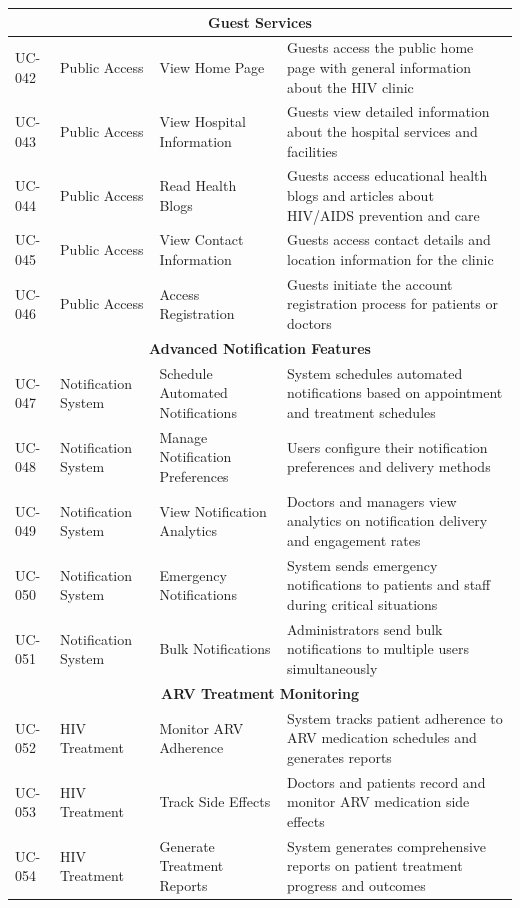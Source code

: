 \documentclass[12pt,a4paper]{article}
\begin{document}
\begin{longtable}{|p{1cm}|p{3cm}|p{3cm}|p{7cm}|}
\hline
\multicolumn{4}{|c|}{\textbf{Guest Services}} \\
\hline
UC-042 & Public Access & View Home Page & Guests access the public home page with general information about the HIV clinic \\
\hline
UC-043 & Public Access & View Hospital Information & Guests view detailed information about the hospital services and facilities \\
\hline
UC-044 & Public Access & Read Health Blogs & Guests access educational health blogs and articles about HIV/AIDS prevention and care \\
\hline
UC-045 & Public Access & View Contact Information & Guests access contact details and location information for the clinic \\
\hline
UC-046 & Public Access & Access Registration & Guests initiate the account registration process for patients or doctors \\
\hline
\multicolumn{4}{|c|}{\textbf{Advanced Notification Features}} \\
\hline
UC-047 & Notification System & Schedule Automated Notifications & System schedules automated notifications based on appointment and treatment schedules \\
\hline
UC-048 & Notification System & Manage Notification Preferences & Users configure their notification preferences and delivery methods \\
\hline
UC-049 & Notification System & View Notification Analytics & Doctors and managers view analytics on notification delivery and engagement rates \\
\hline
UC-050 & Notification System & Emergency Notifications & System sends emergency notifications to patients and staff during critical situations \\
\hline
UC-051 & Notification System & Bulk Notifications & Administrators send bulk notifications to multiple users simultaneously \\
\hline
\multicolumn{4}{|c|}{\textbf{ARV Treatment Monitoring}} \\
\hline
UC-052 & HIV Treatment & Monitor ARV Adherence & System tracks patient adherence to ARV medication schedules and generates reports \\
\hline
UC-053 & HIV Treatment & Track Side Effects & Doctors and patients record and monitor ARV medication side effects \\
\hline
UC-054 & HIV Treatment & Generate Treatment Reports & System generates comprehensive reports on patient treatment progress and outcomes \\

\end{longtable}
\end{document}
